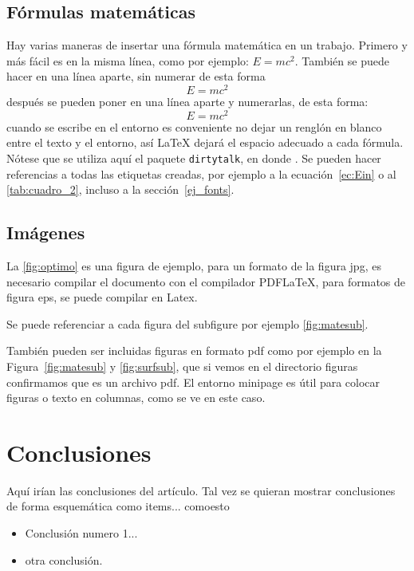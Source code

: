 \documentclass[a4paper,11pt]{article}
\begin{document}
\subsection{Fórmulas matemáticas}
Hay varias maneras de insertar una fórmula matemática en un trabajo. Primero y más fácil es en la misma línea, como por ejemplo: $E=mc^{2}$. También se puede hacer en una línea aparte, sin numerar de esta forma $$E=mc^{2}$$ después se pueden poner en una línea aparte y numerarlas, de esta forma: 
\begin{equation}\label{ec:Ein}
  E=mc^{2}
\end{equation} %
%
cuando se escribe en el entorno  es conveniente no dejar un renglón en blanco entre el texto y el entorno, así LaTeX dejará el espacio adecuado a cada fórmula. Nótese que se utiliza aquí el paquete \texttt{dirtytalk}, en donde . Se pueden hacer referencias a todas las etiquetas creadas, por ejemplo a la ecuación~\eqref{ec:Ein} o al \autoref{tab:cuadro_2}, incluso a la sección~\ref{ej_fonts}.


\subsection{Imágenes}
%
La \autoref{fig:optimo} es una figura de ejemplo, para un formato de la figura jpg, es necesario compilar el documento con el compilador PDFLaTeX, para formatos de figura eps, se puede compilar en Latex.


Se puede referenciar a cada figura del subfigure por ejemplo \autoref{fig:matesub}.\\




\begin{minipage}[b]{0.45\textwidth}
También pueden ser incluidas figuras en formato pdf como por ejemplo en la Figura~\ref{fig:matesub} y \autoref{fig:surfsub}, que si vemos en el directorio figuras confirmamos que es un archivo pdf. El entorno minipage es útil para colocar figuras o texto en columnas, como se ve en este caso.  
    \end{minipage}
    \hfil





\newpage

\section{Conclusiones}
%
Aquí irían las conclusiones del artículo.  Tal vez se quieran mostrar conclusiones de forma esquemática como items... comoesto
%
\begin{itemize}
  \item Conclusión numero 1... 
  \item otra conclusión.
\end{itemize}
\end{document}
